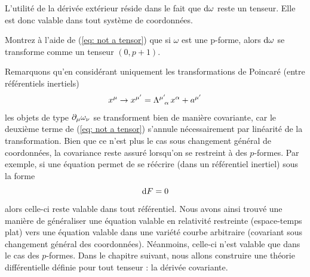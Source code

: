 L'utilité de la dérivée extérieur réside dans le fait que $\mathrm{d} \omega $ reste un tenseur. Elle est donc valable dans tout système de coordonnées.
\begin{exerc}
    Montrez à l'aide de (\ref{eq: not a tensor}) que si $\omega $ est une p-forme, alors $\mathrm{d} \omega $ se transforme comme un tenseur $(0,p+1)$.
\end{exerc}
Remarquons qu'en considérant uniquement les transformations de Poincaré (entre référentiels inertiels)
\begin{equation}
    x^\mu \to x^{\mu'} = \Lambda\indices{^{\mu'}_\!_\alpha}\,x^\alpha +a^{\mu'}
\end{equation}
les objets de type $\partial_\mu \omega _\nu$ se transforment bien de manière covariante, car le deuxième terme de (\ref{eq: not a tensor}) s'annule nécessairement par linéarité de la transformation. Bien que ce n'est plus le cas sous changement général de coordonnées, la covariance reste assuré lorsqu'on se restreint à des $p$-formes. Par exemple, si une équation permet de se réécrire (dans un référentiel inertiel) sous la forme
\begin{equation}
    \mathrm{d} F = 0
\end{equation}
alors celle-ci reste valable dans tout référentiel. Nous avons ainsi trouvé une manière de généraliser une équation valable en relativité restreinte (espace-temps plat) vers une équation valable dans une variété courbe arbitraire (covariant sous changement général des coordonnées). Néanmoins, celle-ci n'est valable que dans le cas des $p$-formes. Dans le chapitre suivant, nous allons construire une théorie différentielle définie pour tout tenseur : la dérivée covariante.

